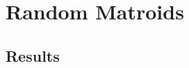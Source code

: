 \section{Random Matroids}

\skelpars[8]{}


\subsection*{Results}
\begin{table*}[ht]
  \centering
  \skelcaption[1]{}
  \skeltabular[10]
\end{table*}
\skelpars[4]{}